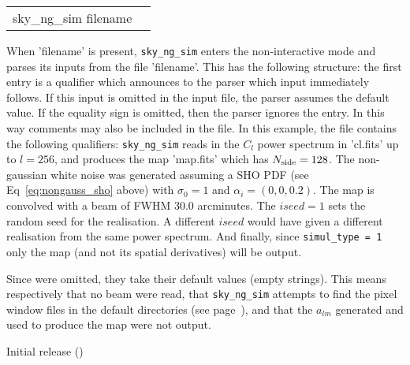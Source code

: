 \begin{examples}{2}
{
\begin{tabular}{ll} %
sky\_ng\_sim  filename \\
\end{tabular}
}
{When 'filename' is present, {\tt sky\_ng\_sim} enters the non-interactive mode and parses
its inputs from the file 'filename'. This has the following
structure: the first entry is a qualifier which announces to the parser
which input immediately follows. If this input is omitted in the
input file, the parser assumes the default value.
If the equality sign is omitted, then the parser ignores the entry.
In this way comments may also be included in the file.
In this example, the file contains the following qualifiers:\hfill\newline
{}
{\tt sky\_ng\_sim} reads in the $C_l$ power spectrum in 'cl.fits' up to $l=256$, and produces the map
'map.fits' which has $N_{\rm side}=128$. The non-gaussian white noise was generated
assuming a SHO PDF (see Eq~\ref{eq:nongauss_sho} above) with $\sigma_0=1$ and
$\alpha_i = (0, 0, 0.2)$.
The map is convolved with a beam of FWHM 30.0 arcminutes. The $iseed=1$ sets
the random seed for the realisation. A different $iseed$ would have given a different 
realisation from the same power spectrum. And finally, since {\tt simul\_type =
1} only the map (and not its spatial derivatives) will be output.

Since \hfill\newline
{}
were omitted, they take their default values (empty strings). 
This means respectively that no beam were read, that {\tt sky\_ng\_sim} attempts to find the pixel
window files in the default directories (see page~\pageref{page:defdir}), and
that the $a_{lm}$ generated and used to produce the map were not output.
}
\end{examples}

\begin{release}
  \begin{relist}
    \item Initial release ()
  \end{relist}
\end{release}


